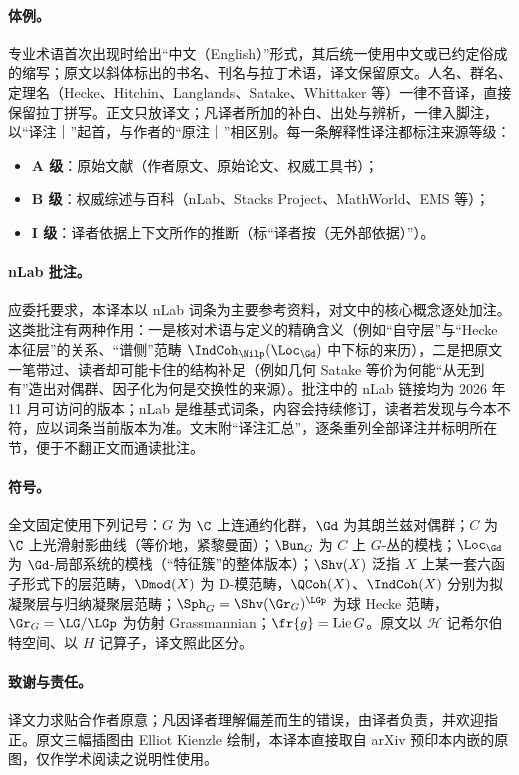 \documentclass[11pt,a4paper,fontset=windows,UTF8]{ctexart}
\begin{document}
\paragraph{体例。}专业术语首次出现时给出“中文（English）”形式，其后统一使用中文或已约定俗成的缩写；原文以斜体标出的书名、刊名与拉丁术语，译文保留原文。人名、群名、定理名（Hecke、Hitchin、Langlands、Satake、Whittaker 等）一律不音译，直接保留拉丁拼写。正文只放译文；凡译者所加的补白、出处与辨析，一律入脚注，以“译注｜”起首，与作者的“原注｜”相区别。每一条解释性译注都标注来源等级：
\begin{itemize}
\item \textbf{A 级}：原始文献（作者原文、原始论文、权威工具书）；
\item \textbf{B 级}：权威综述与百科（nLab、Stacks Project、MathWorld、EMS 等）；
\item \textbf{I 级}：译者依据上下文所作的推断（标“译者按（无外部依据）”）。
\end{itemize}

\paragraph{nLab 批注。}应委托要求，本译本以 nLab 词条为主要参考资料，对文中的核心概念逐处加注。这类批注有两种作用：一是核对术语与定义的精确含义（例如“自守层”与“Hecke 本征层”的关系、“谱侧”范畴 $\IndCoh_{\Nilp}(\Loc_{\Gd})$ 中下标的来历），二是把原文一笔带过、读者却可能卡住的结构补足（例如几何 Satake 等价为何能“从无到有”造出对偶群、因子化为何是交换性的来源）。批注中的 nLab 链接均为 2026 年 11 月可访问的版本；nLab 是维基式词条，内容会持续修订，读者若发现与今本不符，应以词条当前版本为准。文末附“译注汇总”，逐条重列全部译注并标明所在节，便于不翻正文而通读批注。

\paragraph{符号。}全文固定使用下列记号：$G$ 为 $\C$ 上连通约化群，$\Gd$ 为其朗兰兹对偶群；$C$ 为 $\C$ 上光滑射影曲线（等价地，紧黎曼面）；$\Bun_{G}$ 为 $C$ 上 $G$-丛的模栈；$\Loc_{\Gd}$ 为 $\Gd$-局部系统的模栈（“特征簇”的整体版本）；$\Shv(X)$ 泛指 $X$ 上某一套六函子形式下的层范畴，$\Dmod(X)$ 为 D-模范畴，$\QCoh(X)$、$\IndCoh(X)$ 分别为拟凝聚层与归纳凝聚层范畴；$\Sph_{G}=\Shv(\Gr_{G})^{\LGp}$ 为球 Hecke 范畴，$\Gr_{G}=\LG/\LGp$ 为仿射 Grassmannian；$\fr{g}=\operatorname{Lie}G$。原文以 $\mathcal{H}$ 记希尔伯特空间、以 $H$ 记算子，译文照此区分。

\paragraph{致谢与责任。}译文力求贴合作者原意；凡因译者理解偏差而生的错误，由译者负责，并欢迎指正。原文三幅插图由 Elliot Kienzle 绘制，本译本直接取自 arXiv 预印本内嵌的原图，仅作学术阅读之说明性使用。
\end{document}
